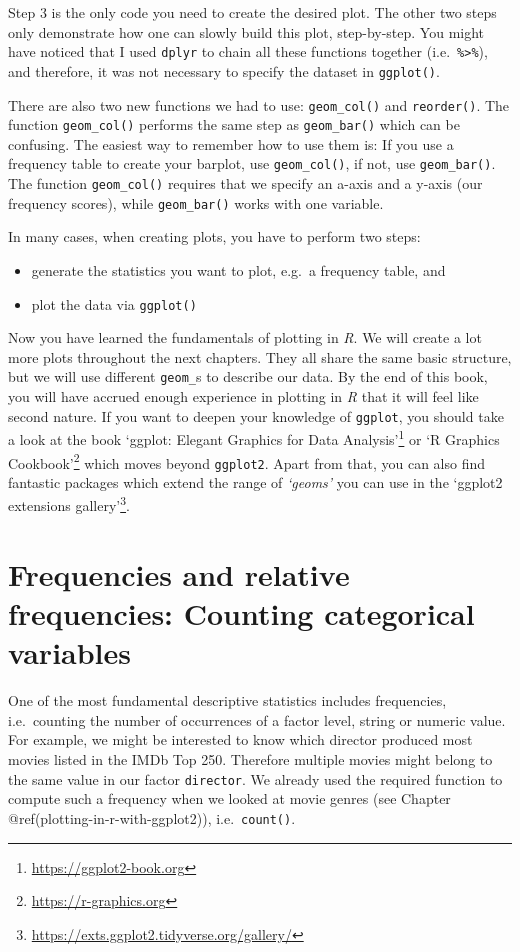 \documentclass[
  letterpaper,
]{krantz}
\renewcommand{\href}[2]{#2\footnote{\url{#1}}}
\begin{document}
Step 3 is the only code you need to create the desired plot. The other
two steps only demonstrate how one can slowly build this plot,
step-by-step. You might have noticed that I used \texttt{dplyr} to chain
all these functions together (i.e.~\texttt{\%\textgreater{}\%}), and
therefore, it was not necessary to specify the dataset in
\texttt{ggplot()}.

There are also two new functions we had to use: \texttt{geom\_col()} and
\texttt{reorder()}. The function \texttt{geom\_col()} performs the same
step as \texttt{geom\_bar()} which can be confusing. The easiest way to
remember how to use them is: If you use a frequency table to create your
barplot, use \texttt{geom\_col()}, if not, use \texttt{geom\_bar()}. The
function \texttt{geom\_col()} requires that we specify an a-axis and a
y-axis (our frequency scores), while \texttt{geom\_bar()} works with one
variable.

In many cases, when creating plots, you have to perform two steps:

\begin{itemize}
\item
  generate the statistics you want to plot, e.g.~a frequency table, and
\item
  plot the data via \texttt{ggplot()}
\end{itemize}

Now you have learned the fundamentals of plotting in \emph{R}. We will
create a lot more plots throughout the next chapters. They all share the
same basic structure, but we will use different \texttt{geom\_}s to
describe our data. By the end of this book, you will have accrued enough
experience in plotting in \emph{R} that it will feel like second nature.
If you want to deepen your knowledge of \texttt{ggplot}, you should take
a look at the book \href{https://ggplot2-book.org}{`ggplot: Elegant
Graphics for Data Analysis'} or \href{https://r-graphics.org}{`R
Graphics Cookbook'} which moves beyond \texttt{ggplot2}. Apart from
that, you can also find fantastic packages which extend the range of
\emph{`geoms'} you can use in the
\href{https://exts.ggplot2.tidyverse.org/gallery/}{`ggplot2 extensions
gallery'}.

\section{Frequencies and relative frequencies: Counting categorical
variables}\label{frequency}

One of the most fundamental descriptive statistics includes frequencies,
i.e.~counting the number of occurrences of a factor level, string or
numeric value. For example, we might be interested to know which
director produced most movies listed in the IMDb Top 250. Therefore
multiple movies might belong to the same value in our factor
\texttt{director}. We already used the required function to compute such
a frequency when we looked at movie genres (see Chapter
@ref(plotting-in-r-with-ggplot2)), i.e.~\texttt{count()}.
\end{document}
